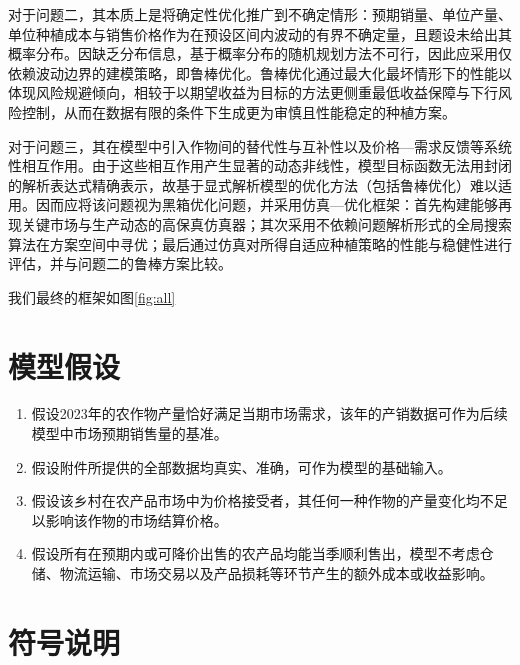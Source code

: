 对于问题二，其本质上是将确定性优化推广到不确定情形：预期销量、单位产量、单位种植成本与销售价格作为在预设区间内波动的有界不确定量，且题设未给出其概率分布。因缺乏分布信息，基于概率分布的随机规划方法不可行，因此应采用仅依赖波动边界的建模策略，即鲁棒优化。鲁棒优化通过最大化最坏情形下的性能以体现风险规避倾向，相较于以期望收益为目标的方法更侧重最低收益保障与下行风险控制，从而在数据有限的条件下生成更为审慎且性能稳定的种植方案。

对于问题三，其在模型中引入作物间的替代性与互补性以及价格—需求反馈等系统性相互作用。由于这些相互作用产生显著的动态非线性，模型目标函数无法用封闭的解析表达式精确表示，故基于显式解析模型的优化方法（包括鲁棒优化）难以适用。因而应将该问题视为黑箱优化问题，并采用仿真—优化框架：首先构建能够再现关键市场与生产动态的高保真仿真器；其次采用不依赖问题解析形式的全局搜索算法在方案空间中寻优；最后通过仿真对所得自适应种植策略的性能与稳健性进行评估，并与问题二的鲁棒方案比较。

我们最终的框架如图\ref{fig:all}



\section{模型假设}

\begin{enumerate}
	\item 假设2023年的农作物产量恰好满足当期市场需求，该年的产销数据可作为后续模型中市场预期销售量的基准。
	\item 假设附件所提供的全部数据均真实、准确，可作为模型的基础输入。
	\item 假设该乡村在农产品市场中为价格接受者，其任何一种作物的产量变化均不足以影响该作物的市场结算价格。
	\item 假设所有在预期内或可降价出售的农产品均能当季顺利售出，模型不考虑仓储、物流运输、市场交易以及产品损耗等环节产生的额外成本或收益影响。
\end{enumerate}


\section{符号说明}

